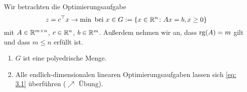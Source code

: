 Wir betrachten die Optimierungsaufgabe
\begin{equation}
	z = c^{\top} x \to \min \text{ bei } x \in G \mathrel{:=} \left\{ x \in \mathbb{R}^n \colon Ax=b, x \ge 0 \right\} \label{eq: 3.1}
\end{equation}
mit $A \in \mathbb{R}^{m \times n}$, $c \in \mathbb{R}^n$, $b \in \mathbb{R}^m$. Außerdem nehmen wir an, dass $\operatorname{rg}(A) = m$ gilt und dass $m \le n$ erfüllt ist.

\begin{bemerkung} %
	\begin{enumerate}[nolistsep]
		\item $G$ ist eine polyedrische Menge.
		\item Alle endlich-dimensionalen linearen Optimierungsaufgaben lassen sich  \eqref{eq: 3.1} überführen ($\nearrow$ Übung).
	\end{enumerate}
\end{bemerkung}
